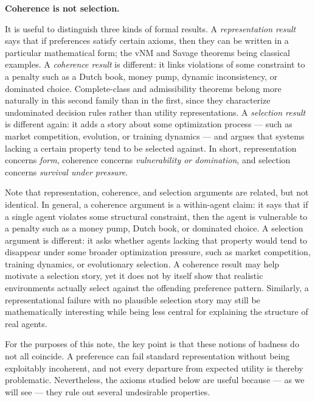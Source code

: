 \documentclass[11pt]{article}
\begin{document}
\vspace{3pt}
\begin{callout}

\textbf{Coherence is not selection.}\par\smallskip

It is useful to distinguish three kinds of formal results. A
\emph{representation result} says that if preferences satisfy certain axioms,
then they can be written in a particular mathematical form; the vNM and Savage
theorems being classical examples. A \emph{coherence result} is different: it
links violations of some constraint to a penalty such as a Dutch book, money
pump, dynamic inconsistency, or dominated choice. Complete-class and
admissibility theorems belong more naturally in this second family than in the
first, since they characterize undominated decision rules rather than utility
representations. A \emph{selection result} is different again: it adds a story
about some optimization process --- such as market competition, evolution, or
training dynamics --- and argues that systems lacking a certain property tend to
be selected against. In short, representation concerns \emph{form}, coherence
concerns \emph{vulnerability or domination}, and selection concerns
\emph{survival under pressure}.

Note that representation, coherence, and selection arguments are related, but not identical. 
In general, a coherence argument is a
within-agent claim: it says that if a single agent violates some structural
constraint, then the agent is vulnerable to a penalty such as a money pump,
Dutch book, or dominated choice. A selection argument is different: it asks
whether agents lacking that property would tend to disappear under some broader
optimization pressure, such as market competition, training dynamics, or
evolutionary selection. 
A coherence result may help motivate a selection story, yet it does not by itself
show that realistic environments actually select against the offending
preference pattern. Similarly, a representational failure with no plausible
selection story may still be mathematically interesting while being less central
for explaining the structure of real agents.

For the purposes of this note, the key point is that these notions of badness do
not all coincide. A preference can fail standard representation without being
exploitably incoherent, and not every departure from expected utility is thereby
problematic. Nevertheless, the axioms studied below are useful because --- as we
will see --- they rule out several undesirable properties. 

\end{callout}
\end{document}
